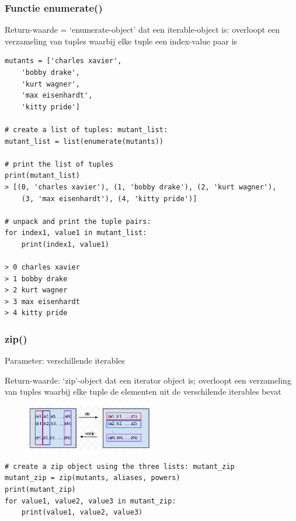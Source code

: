 \documentclass{article}
\begin{document}
\subsubsection{Functie enumerate()}

Return-waarde = `enumerate-object' dat een iterable-object is:
overloopt een verzameling van tuples waarbij elke tuple een index-value paar is

\begin{verbatim}
mutants = ['charles xavier', 
    'bobby drake', 
    'kurt wagner', 
    'max eisenhardt', 
    'kitty pride']

# create a list of tuples: mutant_list:
mutant_list = list(enumerate(mutants))

# print the list of tuples
print(mutant_list)
> [(0, 'charles xavier'), (1, 'bobby drake'), (2, 'kurt wagner'), 
    (3, 'max eisenhardt'), (4, 'kitty pride')]

# unpack and print the tuple pairs:
for index1, value1 in mutant_list:
    print(index1, value1)

> 0 charles xavier
> 1 bobby drake
> 2 kurt wagner
> 3 max eisenhardt
> 4 kitty pride
\end{verbatim}

\subsubsection{zip()}

Parameter: verschillende iterables

Return-waarde: `zip'-object dat een iterator object is;
overloopt een verzameling van tuples waarbij elke tuple de elementen
uit de verschilende iterables bevat

\begin{figure}[H]
    \centering
    \includegraphics[width=0.5\textwidth]{zip.png}
    \caption{}
\end{figure}

\begin{verbatim}
# create a zip object using the three lists: mutant_zip
mutant_zip = zip(mutants, aliases, powers)
print(mutant_zip)
for value1, value2, value3 in mutant_zip:
    print(value1, value2, value3)
\end{verbatim}
\end{document}
